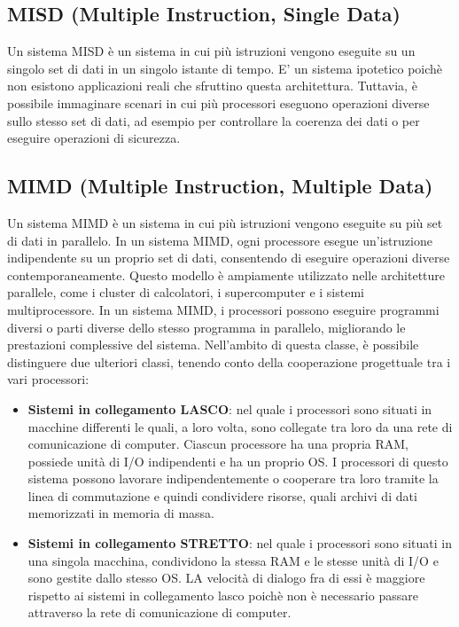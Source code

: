 \documentclass[12pt]{report}
\begin{document}
	\subsection{MISD (Multiple Instruction, Single Data)}
	Un sistema MISD è un sistema in cui più istruzioni vengono eseguite su un singolo set di dati in un singolo istante di tempo. E' un sistema ipotetico poichè non esistono applicazioni reali che sfruttino questa architettura. Tuttavia, è possibile immaginare scenari in cui più processori eseguono operazioni diverse sullo stesso set di dati, ad esempio per controllare la coerenza dei dati o per eseguire operazioni di sicurezza.

	\subsection{MIMD (Multiple Instruction, Multiple Data)}
	Un sistema MIMD è un sistema in cui più istruzioni vengono eseguite su più set di dati in parallelo. In un sistema MIMD, ogni processore esegue un'istruzione indipendente su un proprio set di dati, consentendo di eseguire operazioni diverse contemporaneamente. Questo modello è ampiamente utilizzato nelle architetture parallele, come i cluster di calcolatori, i supercomputer e i sistemi multiprocessore. In un sistema MIMD, i processori possono eseguire programmi diversi o parti diverse dello stesso programma in parallelo, migliorando le prestazioni complessive del sistema. Nell'ambito di questa classe, è possibile distinguere due ulteriori classi, tenendo conto della cooperazione progettuale tra i vari processori:
	\begin{itemize}
		\item \textbf{Sistemi in collegamento LASCO}: nel quale i processori sono situati in macchine differenti le quali, a loro volta, sono collegate tra loro da una rete di comunicazione di computer. Ciascun processore ha una propria RAM, possiede unità di I/O indipendenti e ha un proprio OS. I processori di questo sistema possono lavorare indipendentemente o cooperare tra loro tramite la linea di commutazione e quindi condividere risorse, quali archivi di dati memorizzati in memoria di massa.
		\item \textbf{Sistemi in collegamento STRETTO}: nel quale i processori sono situati in una singola macchina, condividono la stessa RAM e le stesse unità di I/O e sono gestite dallo stesso OS. LA velocità di dialogo fra di essi è maggiore rispetto ai sistemi in collegamento lasco poichè non è necessario passare attraverso la rete di comunicazione di computer. 
	\end{itemize}
\end{document}
